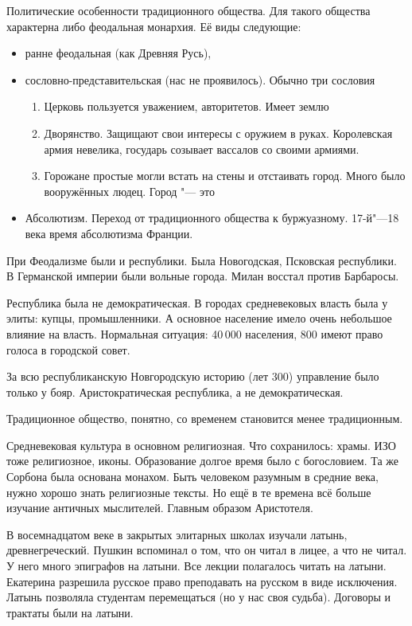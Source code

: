 Политические особенности традиционного общества. Для такого общества характерна либо феодальная монархия. Её виды следующие: 
\begin{itemize}
\item ранне феодальная (как Древняя Русь),
\item сословно-представительская (нас не проявилось). Обычно три сословия
\begin{enumerate} 
\item Церковь пользуется уважением, авторитетов. Имеет землю
\item Дворянство. Защищают свои интересы с оружием в руках. Королевская армия невелика, государь созывает вассалов со своими армиями.
\item Горожане простые могли встать на стены и отстаивать город. Много было вооружённых людец. Город "--- это 
\end{enumerate}
\item Абсолютизм. Переход от традиционного общества к буржуазному. 17-й"---18 века время абсолютизма Франции.
\end{itemize}
При Феодализме были и республики. Была Новогодская, Псковская республики. В Германской империи были вольные города.
Милан восстал против Барбаросы.

Республика была не демократическая. В городах средневековых власть была у элиты: купцы, промышленники. А основное население имело очень небольшое влияние на власть. Нормальная ситуация: 40\,000 населения, 800 имеют право голоса в городской совет.

За всю республиканскую Новгородскую историю (лет 300) управление было только у бояр. Аристократическая республика, а не демократическая.

Традиционное общество, понятно, со временем становится менее традиционным.

Средневековая культура в основном религиозная. Что сохранилось: храмы. ИЗО тоже религиозное, иконы. Образование долгое время было с богословием. Та же Сорбона была основана монахом. Быть человеком разумным в средние века, нужно хорошо знать религиозные тексты. Но ещё в те времена всё больше изучание античных мыслителей. Главным образом Аристотеля.

В восемнадцатом веке в закрытых элитарных школах изучали латынь, древнегреческий. Пушкин вспоминал о том, что он читал в лицее, а что не читал. У него много эпиграфов на латыни. Все лекции полагалось читать на латыни. Екатерина разрешила русское право преподавать на русском в виде исключения. Латынь позволяла студентам перемещаться (но у нас своя судьба). Договоры и трактаты были на латыни.

